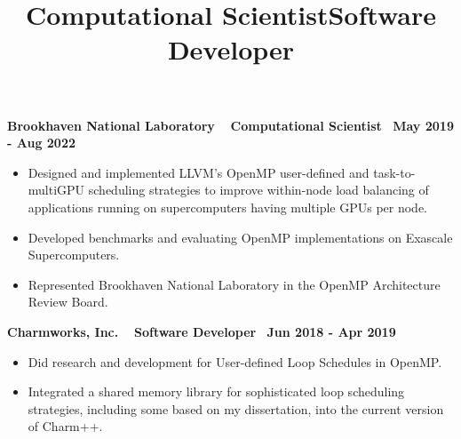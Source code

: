 \title{Computational Scientist} 
\textbf{{Brookhaven National Laboratory $\>$$\>$$\>$$\>$Computational Scientist$\>$$\>$$\>$$\>$May 2019 - Aug 2022}}
\begin{itemize}
   \item Designed and implemented LLVM's OpenMP user-defined and task-to-multiGPU scheduling strategies to improve within-node load balancing of applications running on supercomputers having multiple GPUs per node.
   \item Developed benchmarks and evaluating OpenMP implementations on Exascale Supercomputers.
   \item Represented Brookhaven National Laboratory in the OpenMP Architecture Review Board. 
\end{itemize}

\title{Software Developer}
\textbf{Charmworks, Inc. $\>$$\>$$\>$$\>$Software Developer$\>$$\>$$\>$$\>$Jun 2018 - Apr 2019}
\vspace{0.0in}
\begin{itemize}
\item Did research and development for User-defined Loop Schedules in OpenMP.
\item Integrated a shared memory library for sophisticated loop scheduling strategies, including some based on my dissertation, into the current version of Charm++. 
\end{itemize}
